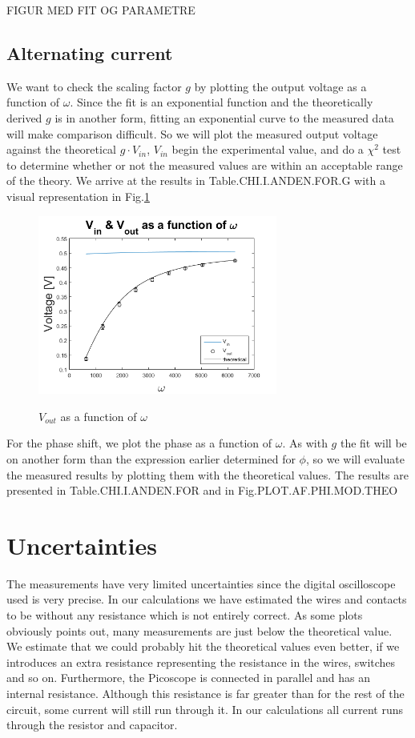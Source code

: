 \documentclass[../main/main.tex]{subfiles}
\begin{document}
FIGUR MED FIT OG PARAMETRE

\subsection*{Alternating current}

We want to check the scaling factor \( g \) by plotting the output voltage as a function of \( \omega \).
Since the fit is an exponential function and the theoretically derived \( g \) is in another form, fitting an exponential curve to the measured data will make comparison difficult. So we will plot the measured output voltage against the theoretical \( g \cdot V_{in} \), \( V_{in} \) begin the experimental value, and do a \( \chi^2 \) test to determine whether or not the measured values are within an acceptable range of the theory.
We arrive at the results in Table.CHI.I.ANDEN.FOR.G with a visual representation in Fig.\ref{fig:VinVudafphi}

\begin{figure}[!ht]
  \caption{ \( V_{out} \) as a function of \( \omega \) }
  \centering
    \includegraphics[width=0.7\textwidth]{../img/VinVudafphi.png}
    \label{fig:VinVudafphi}
\end{figure}

For the phase shift, we plot the phase as a function of \( \omega \).
As with \( g \) the fit will be on another form than the expression earlier determined for \( \phi \), so we will evaluate the measured results by plotting them with the theoretical values.
The results are presented in Table.CHI.I.ANDEN.FOR and in Fig.PLOT.AF.PHI.MOD.THEO

\section{Uncertainties}

The measurements have very limited uncertainties since the digital oscilloscope used is very precise.
In our calculations we have estimated the wires and contacts to be without any resistance which is not entirely correct.
As some plots obviously points out, many measurements are just below the theoretical value.
We estimate that we could probably hit the theoretical values even better, if we introduces an extra resistance representing the resistance in the wires, switches and so on.
Furthermore, the Picoscope is connected in parallel and has an internal resistance.
Although this resistance is far greater than for the rest of the circuit, some current will still run through it.
In our calculations all current runs through the resistor and capacitor.
\end{document}
